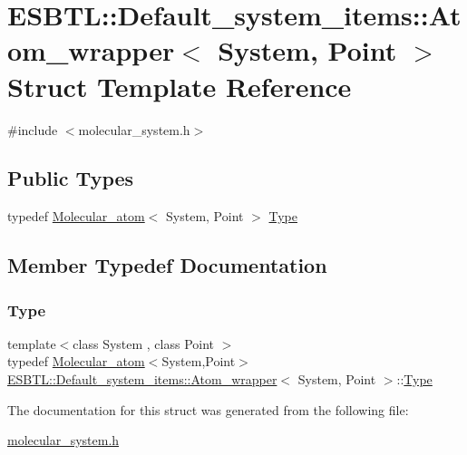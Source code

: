 \hypertarget{structESBTL_1_1Default__system__items_1_1Atom__wrapper}{}\section{E\+S\+B\+TL\+:\+:Default\+\_\+system\+\_\+items\+:\+:Atom\+\_\+wrapper$<$ System, Point $>$ Struct Template Reference}
\label{structESBTL_1_1Default__system__items_1_1Atom__wrapper}


{\ttfamily \#include $<$molecular\+\_\+system.\+h$>$}

\subsection*{Public Types}
\begin{DoxyCompactItemize}
\item 
typedef \hyperlink{classESBTL_1_1Molecular__atom}{Molecular\+\_\+atom}$<$ System, Point $>$ \hyperlink{structESBTL_1_1Default__system__items_1_1Atom__wrapper_a8b4149ac17f0fec6f837ec3ac5d225f8}{Type}
\end{DoxyCompactItemize}


\subsection{Member Typedef Documentation}
\mbox{\label{structESBTL_1_1Default__system__items_1_1Atom__wrapper_a8b4149ac17f0fec6f837ec3ac5d225f8}} 
\subsubsection{\texorpdfstring{Type}{Type}}
{\footnotesize\ttfamily template$<$class System , class Point $>$ \\
typedef \hyperlink{classESBTL_1_1Molecular__atom}{Molecular\+\_\+atom}$<$System,Point$>$ \hyperlink{structESBTL_1_1Default__system__items_1_1Atom__wrapper}{E\+S\+B\+T\+L\+::\+Default\+\_\+system\+\_\+items\+::\+Atom\+\_\+wrapper}$<$ System, Point $>$\+::\hyperlink{structESBTL_1_1Default__system__items_1_1Atom__wrapper_a8b4149ac17f0fec6f837ec3ac5d225f8}{Type}}



The documentation for this struct was generated from the following file\+:\begin{DoxyCompactItemize}
\item 
\hyperlink{molecular__system_8h}{molecular\+\_\+system.\+h}\end{DoxyCompactItemize}
